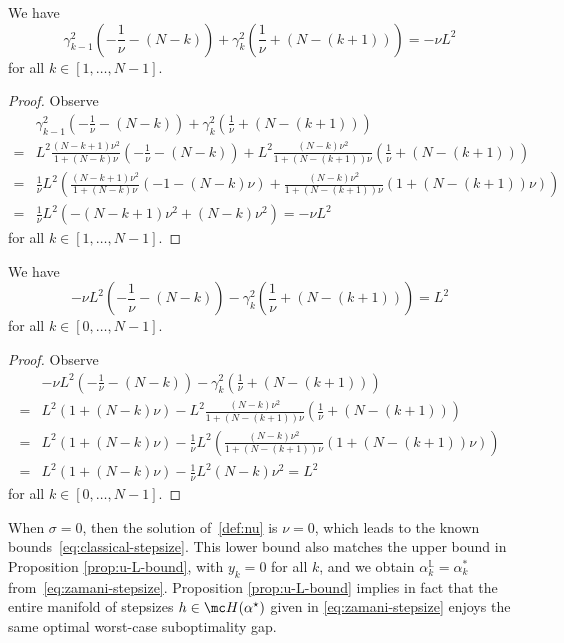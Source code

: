 \documentclass{article}
\begin{document}
\begin{toappendix}
\begin{lemma}
  \label{eq:gamma-identity}
  We have
  \[
    \gamma_{k-1}^2 \left(-\frac{1}{\nu}-(N-k)\right)+\gamma^2_{k} \left( \frac{1}{\nu}+(N-(k+1)) \right) =-\nu L^2
  \]
  for all $k\in [1, \dots, N-1]$.
\end{lemma}
\begin{proof}
  Observe
  \begin{align*}
    & \gamma_{k-1}^2 \left(-\frac{1}{\nu}-(N-k)\right)+\gamma^2_{k} \left( \frac{1}{\nu}+(N-(k+1)) \right)\\
    = & L^2 \frac{(N-k+1)\nu^2}{1+(N-k)\nu} \left(-\frac{1}{\nu}-(N-k)\right)+L^2 \frac{(N-k)\nu^2}{1+(N-(k+1))\nu} \left( \frac{1}{\nu}+(N-(k+1)) \right)\\
    = & \frac 1\nu L^2 \left(\frac{(N-k+1)\nu^2}{1+(N-k)\nu} \left(-1-(N-k)\nu\right)  +\frac{(N-k)\nu^2}{1+(N-(k+1))\nu} \left( 1+(N-(k+1))\nu \right) \right)\\
    = & \frac 1\nu L^2 \left(-(N-k+1)\nu^2  + (N-k)\nu^2\right)=-\nu L^2
  \end{align*}
  for all $k\in [1, \dots, N-1]$.
\end{proof}

\begin{lemma}
  \label{eq:gamma-identity-2}
  We have
  \[
    -\nu L^2 \left(-\frac{1}{\nu}-(N-k)\right) - \gamma^2_{k} \left( \frac{1}{\nu}+(N-(k+1)) \right) = L^2
  \]
  for all $k\in [0, \dots, N-1]$.
\end{lemma}
\begin{proof}
  Observe
  \begin{align*}
    & -\nu L^2 \left(-\frac{1}{\nu}-(N-k)\right)-\gamma^2_{k} \left( \frac{1}{\nu}+(N-(k+1)) \right)\\
    = & L^2 \left(1+(N-k)\nu\right)-L^2 \frac{(N-k)\nu^2}{1+(N-(k+1))\nu} \left( \frac{1}{\nu}+(N-(k+1)) \right)\\
    = &  L^2 \left(1+(N-k)\nu\right)- \frac 1\nu L^2 \left(\frac{(N-k)\nu^2}{1+(N-(k+1))\nu} \left( 1+(N-(k+1))\nu \right) \right)\\
    = & L^2 \left(1+(N-k)\nu\right)- \frac 1\nu L^2 (N-k)\nu^2= L^2
  \end{align*}
  for all $k\in [0, \dots, N-1]$.
\end{proof}

\end{toappendix}

When $\sigma=0$, then the solution of~\eqref{def:nu} is $\nu=0$, which leads to the known bounds~\eqref{eq:classical-stepsize}. This lower bound also matches the upper bound in Proposition \ref{prop:u-L-bound}, with $y_k=0$ for all $k$, and we obtain $\alpha_k^{\mathbb L}=\alpha_k^*$ from~\eqref{eq:zamani-stepsize}.
Proposition \ref{prop:u-L-bound} implies in fact that the entire manifold of stepsizes $h\in \mc H(\alpha^\star)$ given in \eqref{eq:zamani-stepsize} enjoys the same optimal worst-case suboptimality gap.
\end{document}
